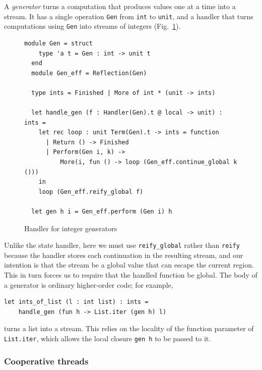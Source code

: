 \documentclass[acmsmall, screen, review, anonymous]{acmart}
\theoremstyle{definition}
\begin{document}
A \emph{generator} turns a computation that produces values one at a
time into a stream. It has a single operation
\lstinline[style=oxcaml]{Gen} from \lstinline[style=oxcaml]{int} to
\lstinline[style=oxcaml]{unit}, and a handler that turns computations
using \lstinline[style=oxcaml]{Gen} into streams of integers
(Fig.~\ref{fig:gen}).
\begin{figure}
\begin{lstlisting}[style=oxcaml]
  module Gen = struct
    type 'a t = Gen : int -> unit t
  end
  module Gen_eff = Reflection(Gen)

  type ints = Finished | More of int * (unit -> ints)

  let handle_gen (f : Handler(Gen).t @ local -> unit) : ints =
    let rec loop : unit Term(Gen).t -> ints = function
      | Return () -> Finished
      | Perform(Gen i, k) ->
          More(i, fun () -> loop (Gen_eff.continue_global k ()))
    in
    loop (Gen_eff.reify_global f)

  let gen h i = Gen_eff.perform (Gen i) h
\end{lstlisting}
\caption{Handler for integer generators}
\label{fig:gen}
\end{figure}
Unlike the state handler, here we must use
\lstinline[style=oxcaml]{reify_global} rather than
\lstinline[style=oxcaml]{reify} because the handler stores each
continuation in the resulting stream, and our intention is that the
stream be a global value that can escape the current region. This in
turn forces us to require that the handled function be global. The
body of a generator is ordinary higher-order code; for example,
\begin{lstlisting}[style=oxcaml]
  let ints_of_list (l : int list) : ints =
    handle_gen (fun h -> List.iter (gen h) l)
\end{lstlisting}
turns a list into a stream. This relies on the locality of the function
parameter of \lstinline[style=oxcaml]{List.iter}, which allows the local
closure \lstinline[style=oxcaml]{gen h} to be passed to it.

\subsubsection{Cooperative threads}
\end{document}
